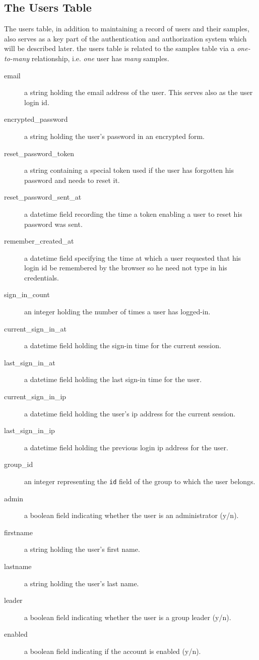 \documentclass[12pt]{article}
\begin{document}
\subsection{The Users Table}
The users table, in addition to maintaining a record of users and their
samples, also serves as a key part of the authentication and authorization
system which will be described later. the users table is related to the
samples table via a \emph{one-to-many} relationship, i.e. \emph{one} user
has \emph{many} samples.
\begin{description}
\item[email]
a string holding the email address of the user. This serves also as the
user login id.
\item[encrypted\_password]
a string holding the user's password in an encrypted form.
\item[reset\_password\_token]
a string containing a special token used if the user has forgotten his
password and needs to reset it.
\item[reset\_password\_sent\_at]
a datetime field recording the time a token enabling a user to reset his
password was sent.
\item[remember\_created\_at]
a datetime field specifying the time at which a user requested that his
login id be remembered by the browser so he need not type in his credentials.
\item[sign\_in\_count]
an integer holding the number of times a user has logged-in.
\item[current\_sign\_in\_at]
a datetime field holding the sign-in time for the current session.
\item[last\_sign\_in\_at]
a datetime field holding the last sign-in time for the user.
\item[current\_sign\_in\_ip]
a datetime field holding the user's ip address for the current session.
\item[last\_sign\_in\_ip]
a datetime field holding the previous login ip address for the user.
\item[group\_id]
an integer representing the \verb=id= field of the group to which
the user belongs.
\item[admin]
a boolean field indicating whether the user is an administrator (y/n).
\item[firstname]
a string holding the user's first name.
\item[lastname]
a string holding the user's last name.
\item[leader]
a boolean field indicating whether the user is a group leader (y/n).
\item[enabled]
a boolean field indicating if the account is enabled (y/n).

\end{description}
\end{document}
